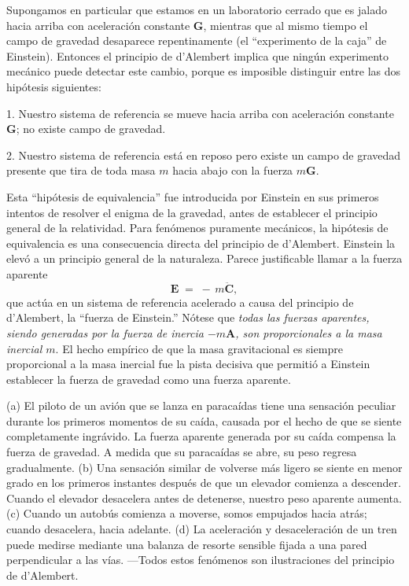 \documentclass[12pt,a4paper]{book}
\begin{document}
Supongamos en particular que estamos en un laboratorio cerrado que es jalado hacia arriba con aceleración constante $\mathbf{G}$, mientras que al mismo tiempo el campo de gravedad desaparece repentinamente (el ``experimento de la caja'' de Einstein). Entonces el principio de d'Alembert implica que ningún experimento mecánico puede detectar este cambio, porque es imposible distinguir entre las dos hipótesis siguientes:

1. Nuestro sistema de referencia se mueve hacia arriba con aceleración constante $\mathbf{G}$; no existe campo de gravedad.

2. Nuestro sistema de referencia está en reposo pero existe un campo de gravedad presente que tira de toda masa $m$ hacia abajo con la fuerza $m\mathbf{G}$.

Esta ``hipótesis de equivalencia'' fue introducida por Einstein en sus primeros intentos de resolver el enigma de la gravedad, antes de establecer el principio general de la relatividad. Para fenómenos puramente mecánicos, la hipótesis de equivalencia es una consecuencia directa del principio de d'Alembert. Einstein la elevó a un principio general de la naturaleza. Parece justificable llamar a la fuerza aparente
\begin{equation}
\mathbf{E} \;=\; -\,m\ddot{\mathbf{C}}, \tag{44.7}
\end{equation}
que actúa en un sistema de referencia acelerado a causa del principio de d'Alembert, la ``fuerza de Einstein.'' Nótese que \textit{todas las fuerzas aparentes, siendo generadas por la fuerza de inercia $-m\mathbf{A}$, son proporcionales a la masa inercial $m$}. El hecho empírico de que la masa gravitacional es siempre proporcional a la masa inercial fue la pista decisiva que permitió a Einstein establecer la fuerza de gravedad como una fuerza aparente.

\medskip
\noindent (a) El piloto de un avión que se lanza en paracaídas tiene una sensación peculiar durante los primeros momentos de su caída, causada por el hecho de que se siente completamente ingrávido. La fuerza aparente generada por su caída compensa la fuerza de gravedad. A medida que su paracaídas se abre, su peso regresa gradualmente. (b) Una sensación similar de volverse más ligero se siente en menor grado en los primeros instantes después de que un elevador comienza a descender. Cuando el elevador desacelera antes de detenerse, nuestro peso aparente aumenta. (c) Cuando un autobús comienza a moverse, somos empujados hacia atrás; cuando desacelera, hacia adelante. (d) La aceleración y desaceleración de un tren puede medirse mediante una balanza de resorte sensible fijada a una pared perpendicular a las vías. ---Todos estos fenómenos son ilustraciones del principio de d'Alembert.
\end{document}
